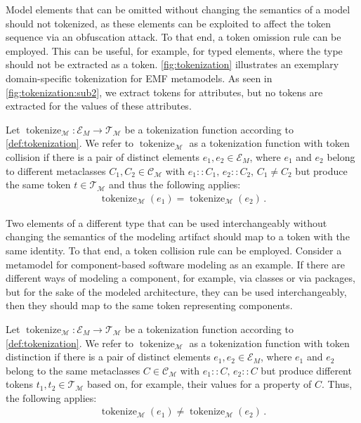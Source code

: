 Model elements that can be omitted without changing the semantics of a model should not tokenized, as these elements can be exploited to affect the token sequence via an obfuscation attack. To that end, a token omission rule can be employed. This can be useful, for example, for typed elements, where the type should not be extracted as a token.
\autoref{fig:tokenization} illustrates an exemplary domain-specific tokenization for \ac{EMF} metamodels. As seen in \autoref{fig:tokenization:sub2}, we extract tokens for attributes, but no tokens are extracted for the values of these attributes.

\begin{theorem}\label{def:token-collision}
Let \( \operatorname{tokenize}_\mathcal{M}: \mathcal{E}_M \rightarrow \mathcal{T}_\mathcal{M} \) be a tokenization function according to \autoref{def:tokenization}. 
We refer to \( \operatorname{tokenize}_\mathcal{M}\) as a tokenization function with token collision if there is a pair of distinct elements \( e_1, e_2 \in \mathcal{E}_M \), where \( e_1 \) and \( e_2 \) belong to different metaclasses \(C_1, C_2 \in \mathcal{C}_\mathcal{M}\) with \( e_1 :: C_1, \, e_2 :: C_2, \, C_1 \neq C_2 \) but produce the same token \(t \in \mathcal{T}_\mathcal{M}\) and thus the following applies:
\begin{align*}
       \operatorname{tokenize}_\mathcal{M}(e_1) = \operatorname{tokenize}_\mathcal{M}(e_2) \, .
\end{align*}
\end{theorem}

Two elements of a different type that can be used interchangeably without changing the semantics of the modeling artifact should map to a token with the same identity. To that end, a token collision rule can be employed.
Consider a metamodel for component-based software modeling as an example. If there are different ways of modeling a component, for example, via classes or via packages, but for the sake of the modeled architecture, they can be used interchangeably, then they should map to the same token representing components.

\begin{theorem}\label{def:token-distinction}
Let \( \operatorname{tokenize}_\mathcal{M}: \mathcal{E}_M \rightarrow \mathcal{T}_\mathcal{M} \) be a tokenization function according to \autoref{def:tokenization}. We refer to \( \operatorname{tokenize}_\mathcal{M}\) as a tokenization function with token distinction if there is a pair of distinct elements \( e_1, e_2 \in \mathcal{E}_M \), where \( e_1 \) and \( e_2 \) belong to the same metaclasses \(C \in \mathcal{C}_\mathcal{M}\) with \( e_1 :: C, \, e_2 :: C\) but produce different tokens \(t_1, t_2 \in \mathcal{T}_\mathcal{M}\) based on, for example, their values for a property of \(C\). Thus, the following applies:
\begin{align*}
       \operatorname{tokenize}_\mathcal{M}(e_1) \neq \operatorname{tokenize}_\mathcal{M}(e_2) \, .
\end{align*}
\end{theorem}

